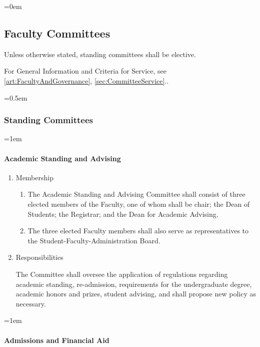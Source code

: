 \documentclass{manual}
\let\oldsubsection\subsection
\renewcommand\subsection{\leftskip=0em\oldsubsection}
\let\oldsubsubsection\subsubsection
\renewcommand\subsubsection{\leftskip=0.5em\oldsubsubsection}
\let\oldparagraph\paragraph
\renewcommand\paragraph{\leftskip=1em\oldparagraph}
\newcommand{\itemLevelA}{\alph*.}
\newcommand{\itemLevelB}{\arabic*)}
\newcommand{\itemRefA}{\alph*}
\newcommand{\itemRefB}{\arabic*}
\begin{document}
\subsection{Faculty Committees} \label{sec:FacultyCommittees}
Unless otherwise stated, standing committees shall be elective.


For General Information and Criteria for Service, see \cref{art:FacultyAndGovernance}, \cref{sec:CommitteeService}..


\subsubsection{Standing Committees}\label{sub:StandingCommittees}


\paragraph{Academic Standing and Advising}

\begin{enumerate}[label=\itemLevelA,ref=\itemRefA]

\item Membership
\begin{enumerate}[label=\itemLevelB,ref=\itemRefB]

\item The Academic Standing and Advising Committee shall consist of three elected members of the Faculty, one of whom shall be chair; the Dean of Students; the Registrar; and the Dean for Academic Advising.

\item The three elected Faculty members shall also serve as representatives to the Student-Faculty-Administration Board.
\end{enumerate}

\item Responsibilities

The Committee shall oversee the application of regulations regarding academic standing, re-admission, requirements for the undergraduate degree, academic honors and prizes, student advising, and shall propose new policy as necessary.

\end{enumerate}


\paragraph{Admissions and Financial Aid}
\end{document}

